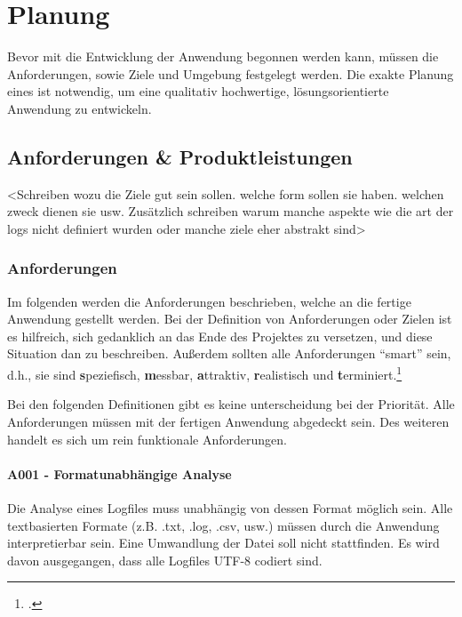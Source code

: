 
\chapter{Planung}\label{cha:Planung}
Bevor mit die Entwicklung der Anwendung begonnen werden kann, müssen die Anforderungen, sowie Ziele und Umgebung festgelegt werden. Die exakte Planung eines ist notwendig, um eine qualitativ hochwertige, lösungsorientierte Anwendung zu entwickeln.


\section{Anforderungen \& Produktleistungen}\label{sec:AnforderungenUndPLs}
<Schreiben wozu die Ziele gut sein sollen. welche form sollen sie haben. welchen zweck dienen sie usw. Zusätzlich schreiben warum manche aspekte wie die art der logs nicht definiert wurden oder manche ziele eher abstrakt sind>

\subsection{Anforderungen}
Im folgenden werden die Anforderungen beschrieben, welche an die fertige Anwendung gestellt werden. Bei der Definition von Anforderungen oder Zielen ist es hilfreich, sich gedanklich an das Ende des Projektes zu versetzen, und diese Situation dan zu beschreiben. Außerdem sollten alle Anforderungen "`smart"' sein, d.h., sie sind \textbf{s}peziefisch, \textbf{m}essbar, \textbf{a}ttraktiv, \textbf{r}ealistisch und \textbf{t}erminiert.\footcite[Vgl.][S. 48]{Bauer.2014}

Bei den folgenden Definitionen gibt es keine unterscheidung bei der Priorität. Alle Anforderungen müssen mit der fertigen Anwendung abgedeckt sein. Des weiteren handelt es sich um rein funktionale Anforderungen. 

\subsubsection{A001 - Formatunabhängige Analyse}\label{subsubsec:A001}
Die Analyse eines Logfiles muss unabhängig von dessen Format möglich sein. Alle textbasierten Formate (z.B. .txt, .log, .csv, usw.) müssen durch die Anwendung interpretierbar sein. Eine Umwandlung der Datei soll nicht stattfinden. Es wird davon ausgegangen, dass alle Logfiles UTF-8 codiert sind.

